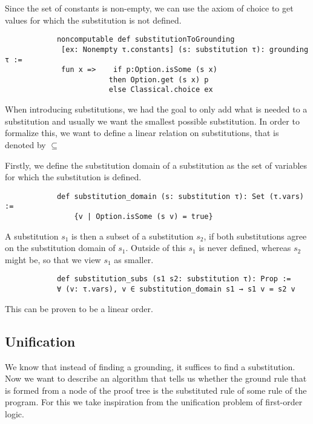 \documentclass{article}
\begin{document}
            Since the set of constants is non-empty, we can use the axiom of choice to get values for which the substitution is not defined.

            \begin{lstlisting}
            noncomputable def substitutionToGrounding 
             [ex: Nonempty τ.constants] (s: substitution τ): grounding τ := 
             fun x =>    if p:Option.isSome (s x) 
                        then Option.get (s x) p 
                        else Classical.choice ex

            \end{lstlisting}

            When introducing substitutions, we had the goal to only add what is needed to a substitution and usually we want the smallest possible substitution. In order to formalize this, we want to define a linear relation on substitutions, that is denoted by $\subseteq$

            Firstly, we define the substitution domain of a substitution as the set of variables for which the substitution is defined. 

            \begin{lstlisting}
            def substitution_domain (s: substitution τ): Set (τ.vars) := 
                {v | Option.isSome (s v) = true}
            \end{lstlisting}

            A substitution $s_1$ is then a subset of a substitution $s_2$, if both substitutions agree on the substitution domain of $s_1$. Outside of this $s_1$ is never defined, whereas $s_2$ might be, so that we view $s_1$ as smaller.

            \begin{lstlisting}
            def substitution_subs (s1 s2: substitution τ): Prop :=
            ∀ (v: τ.vars), v ∈ substitution_domain s1 → s1 v = s2 v
            \end{lstlisting}

            This can be proven to be a linear order.

        \subsection{Unification}

        We know that instead of finding a grounding, it suffices to find a substitution. Now we want to describe an algorithm that tells us whether the ground rule that is formed from a node of the proof tree is the substituted rule of some rule of the program. For this we take inspiration from the unification problem of first-order logic.
\end{document}
